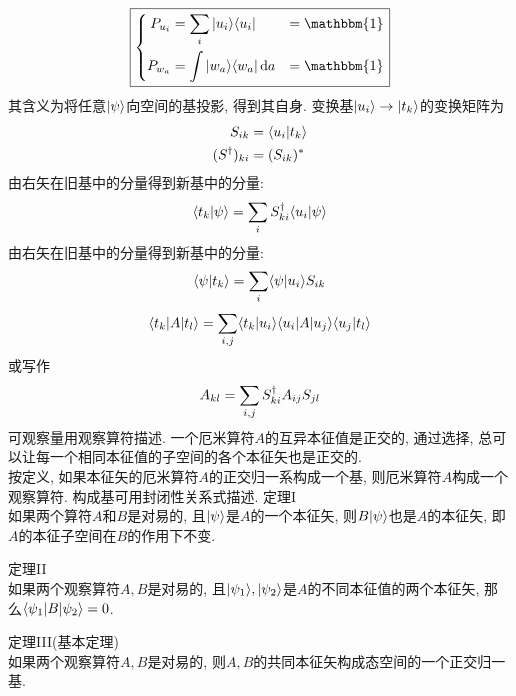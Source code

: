 \documentclass[UTF8]{ctexart}
\numberwithin{equation}{subsection}
\begin{document}
$$\boxed{
    \hua{
        P_{u_i}\x \sum_i\kt{u_i}\br{u_i}\x \mathbbm{1}\\
        P_{w_a}\x \int\kt{w_a}\br{w_a}\d a \x \mathbbm{1}\\
    }
}$$
其含义为将任意$| {\psi} \rangle$向空间的基投影, 得到其自身. 
变换基$| {u_i} \rangle \to | {t_k} \rangle$的变换矩阵为
$$\begin{aligned} 
    S_{ik}&= \langle {u_i|t_k} \rangle\\
    (S^{\dagger})_{ki}&= (S_{ik})^*
 \end{aligned}$$
由右矢在旧基中的分量得到新基中的分量:
$$\langle {t_k|\psi} \rangle=\sum_i S_{ki}^{\dagger}\langle {u_i|\psi} \rangle$$
由右矢在旧基中的分量得到新基中的分量:
$$\langle {\psi|t_k} \rangle=\sum_i \langle {\psi|u_i} \rangle S_{ik}$$
$$\langle {t_k|A|t_l} \rangle=\sum_{i,j} \langle {t_k|u_i} \rangle\langle {u_i|A|u_j} \rangle\langle {u_j|t_l} \rangle$$
或写作
$$A_{kl}=\sum_{i,j}S^{\dagger}_{ki}A_{ij}S_{jl}$$
可观察量用观察算符描述. 一个厄米算符$A$的互异本征值是正交的, 通过选择, 总可以让每一个相同本征值的子空间的各个本征矢也是正交的. \\
按定义, 如果本征矢的厄米算符$A$的正交归一系构成一个基, 则厄米算符$A$构成一个观察算符. 构成基可用封闭性关系式描述. 
定理I\\
如果两个算符$A$和$B$是对易的, 且$| {\psi} \rangle$是$A$的一个本征矢, 则$B| {\psi} \rangle$也是$A$的本征矢, 即$A$的本征子空间在$B$的作用下不变. 

定理II\\
如果两个观察算符$A,B$是对易的, 且$| {\psi_1} \rangle,| {\psi_2} \rangle$是$A$的不同本征值的两个本征矢, 那么$\langle {\psi_1|B|\psi_2} \rangle=0$.

定理III(基本定理)\\
如果两个观察算符$A, B$是对易的, 则$A,B$的共同本征矢构成态空间的一个正交归一基. 
\end{document}
